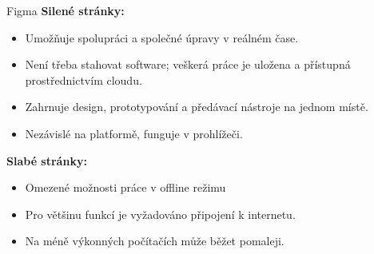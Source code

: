 \begin{subsection}{Figma}
    \textbf{Silené stránky:}
    \begin{itemize}
        \item Umožňuje spolupráci a společné úpravy v reálném čase.
        \item Není třeba stahovat software; veškerá práce je uložena a přístupná prostřednictvím cloudu.
        \item Zahrnuje design, prototypování a předávací nástroje na jednom místě.
        \item Nezávislé na platformě, funguje v prohlížeči.
    \end{itemize}

    \textbf{Slabé stránky:}
    \begin{itemize}
        \item Omezené možnosti práce v offline režimu
        \item Pro většinu funkcí je vyžadováno připojení k internetu.
        \item Na méně výkonných počítačích může běžet pomaleji\cite{w_industry_the_ultimate_battle_figma_vs_sketch_vs_adobe_xd, h_hc_en_us}.
    \end{itemize}
\end{subsection}

